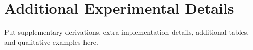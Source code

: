 \section{Additional Experimental Details}

Put supplementary derivations, extra implementation details, additional tables,
and qualitative examples here.
